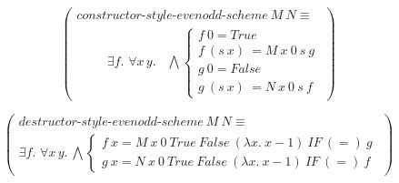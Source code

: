 
\begin{equation}
  \left(\begin{array}{l}
    constructor\textrm{-}style\textrm{-}evenodd\textrm{-}scheme\ M\ N \equiv \\
    \quad \quad \begin{array}{c}
      \exists f.\,\, \forall x\, y. \phantom{,}
    \end{array}
    \bigwedge \left\{
    \begin{array}{l}
      f\ 0 = True\\
      f\ (s\ x)\ = M\ x\ 0\ s\ g\\
      g\ 0 = False\\
      g\ (s\ x)\ = N\ x\ 0\ s\ f
    \end{array}
    \right.
  \end{array}\right)
  \label{constructive-style-evenodd-scheme}
\end{equation}

\begin{equation}
  \left(\begin{array}{l}
    destructor\textrm{-}style\textrm{-}evenodd\textrm{-}scheme\ M\ N \equiv \\
    \exists f.\,\, \forall x\, y.\ \bigwedge \left\{
    \begin{array}{l}
      f\ x  =  M\ x\ 0\ True\ False\ (\lambda x.\ x-1)\ IF\ (=)\ g\\
      g\ x  =  N\ x\ 0\ True\ False\ (\lambda x.\ x-1)\ IF\ (=)\ f
    \end{array}\right.
  \end{array}\right)
  \label{destructive-style-evenodd-scheme}
\end{equation}

